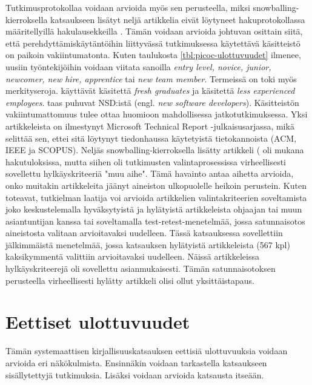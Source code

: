 \documentclass[utf8]{gradu3}
\begin{document}
Tutkimusprotokollaa voidaan arvioida myös sen perusteella, miksi snowballing-kierroksella katsaukseen lisätyt neljä artikkelia eivät löytyneet hakuprotokollassa määritellyillä hakulausekkeilla %
\parencites%
    {bjornson-dingsøyr-2005}%
    {kulkarni-ym-2010}%
    {hemphill-begel-2011}%
    {viviani-murphy-2019}%
\relax.
%
Tämän voidaan arvioida johtuvan osittain siitä, että perehdyttämiskäytäntöihin liittyvässä tutkimuksessa käytettävä käsitteistö on paikoin vakiintumatonta. Kuten taulukosta \ref{tbl:picoc-ulottuvuudet} ilmenee, uusiin työntekijöihin voidaan viitata sanoilla \textit{entry level, novice, junior, newcomer, new hire, apprentice} tai \textit{new team member}. Termeissä on toki myös merkityseroja. \textcite{kulkarni-ym-2010} käyttävät käsitettä \textit{fresh graduates} ja \textcite{bjornson-dingsøyr-2005} käsitettä \textit{less experienced employees}. \textcite{begel-simon-2008} taas puhuvat NSD:istä (engl. \textit{new software developers}). Käsitteistön vakiintumattomuus tulee ottaa huomioon mahdollisessa jatkotutkimuksessa. Yksi artikkeleista \parencite{hemphill-begel-2011} on ilmestynyt Microsoft Technical Report -julkaisusarjassa, mikä selittää sen, ettei sitä löytynyt tiedonhaussa käytetyistä tietokannoista (ACM, IEEE ja SCOPUS). Neljäs snowballing-kierroksella lisätty artikkeli (\textcite{viviani-murphy-2019} oli mukana hakutuloksissa, mutta siihen oli tutkimusten valintaprosessissa virheellisesti sovellettu hylkäyskriteeriä "muu aihe". Tämä havainto antaa aihetta arvioida, onko muitakin artikkeleita jäänyt aineiston ulkopuolelle heikoin perustein. Kuten \textcite{kitchenham-charters-2007} toteavat, tutkielman laatija voi arvioida artikkelien valintakriteerien soveltamista joko keskustelemalla hyväksytyistä ja hylätyistä artikkeleista ohjaajan tai muun asiantuntijan kanssa tai soveltamalla test-retest-menetelmää, jossa satunnaisotos aineistosta valitaan arvioitavaksi uudelleen. Tässä katsauksessa sovellettiin jälkimmäistä menetelmää, jossa katsauksen hylätyistä artikkeleista (567 kpl) kaksikymmentä valittiin arvioitavaksi uudelleen. Näissä artikkeleissa hylkäyskriteerejä oli sovellettu asianmukaisesti. Tämän satunnaisotoksen perusteella virheellisesti hylätty artikkeli \parencite{viviani-murphy-2019} olisi ollut yksittäistapaus. 


\section{Eettiset ulottuvuudet}

Tämän systemaattisen kirjallisuuskatsauksen eettisiä ulottuvuuksia voidaan arvioida eri näkökulmista. Ensinnäkin voidaan tarkastella katsaukseen sisällytettyjä tutkimuksia. Lisäksi voidaan arvioida katsausta itseään.
\end{document}
